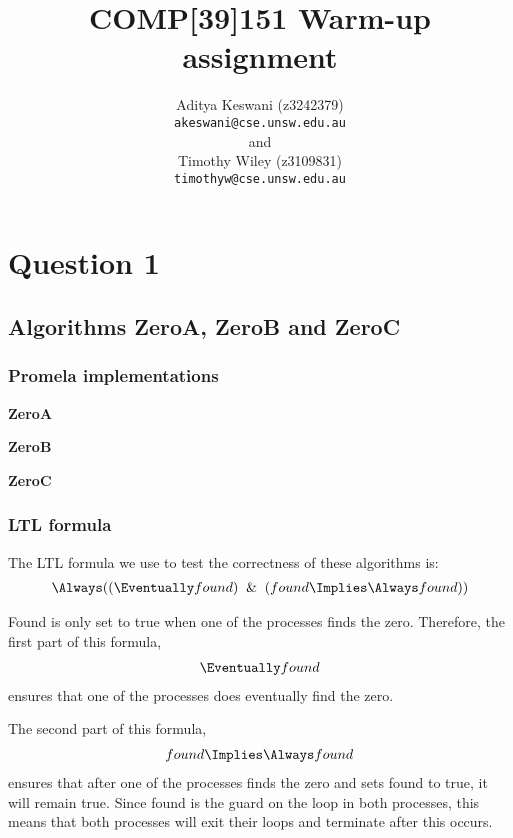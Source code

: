 \documentclass[12pt,a4paper]{scrartcl}
\begin{document}
\title{COMP[39]151 Warm-up assignment}
\author{Aditya Keswani (z3242379) \\ 
        \texttt{akeswani@cse.unsw.edu.au} \\ 
        and \\ 
        Timothy Wiley (z3109831) \\
        \texttt{timothyw@cse.unsw.edu.au} }

\maketitle

\section{Question 1}

\subsection{Algorithms ZeroA, ZeroB and ZeroC}

\subsubsection{Promela implementations}

\textbf{ZeroA}

\textbf{ZeroB}

\textbf{ZeroC}

\subsubsection{LTL formula}

The LTL formula we use to test the correctness of these algorithms is:
\begin{align} \Always ( ( \Eventually found ) \And ( found \Implies \Always found ) ) \end{align}

Found is only set to true when one of the processes finds the zero. Therefore, the first part of this formula, 
\begin{align} \Eventually found \end{align}
ensures that one of the processes does eventually find the zero. 

The second part of this formula, 
\begin{align} found \Implies \Always found \end{align} 
ensures that after one of the processes finds the zero and sets found to true, it will remain true. Since found is the guard on the loop in both processes, this means that both processes will exit their loops and terminate after this occurs.
\end{document}
